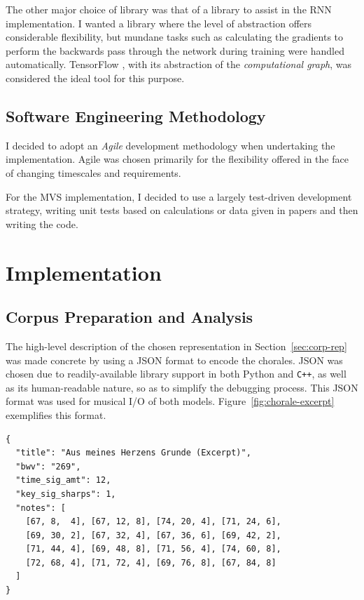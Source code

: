 \documentclass[12pt,a4paper,twoside,openright]{report}
\begin{document}
The other major choice of library was that of a library to assist in the RNN
implementation. I wanted a library where the level of abstraction offers
considerable flexibility, but mundane tasks such as calculating the gradients to
perform the backwards pass through the network during training were handled
automatically. TensorFlow \cite{abadi2016tensorflow}, with its abstraction of
the \emph{computational graph}, was considered the ideal tool for this purpose.

\section{Software Engineering Methodology}

I decided to adopt an \emph{Agile} development methodology when undertaking the
implementation. Agile was chosen primarily for the flexibility offered in the
face of changing timescales and requirements.

For the MVS implementation, I decided to use a largely test-driven development
strategy, writing unit tests based on calculations or data given in papers and
then writing the code. 

\chapter{Implementation}\label{chap:impl}

\section{Corpus Preparation and Analysis}\label{sec:corpus-prep-analysis}

The high-level description of the chosen representation in
Section~\ref{sec:corp-rep} was made concrete by using a JSON format to encode
the chorales. JSON was chosen due to readily-available library support in both
Python and \texttt{C++}, as well as its human-readable nature, so as to simplify
the debugging process. This JSON format was used for musical I/O of both models.
Figure~\ref{fig:chorale-excerpt} exemplifies this format. 

\vspace{4mm}
\begin{verbatim}
{
  "title": "Aus meines Herzens Grunde (Excerpt)",
  "bwv": "269",
  "time_sig_amt": 12,
  "key_sig_sharps": 1,
  "notes": [
    [67, 8,  4], [67, 12, 8], [74, 20, 4], [71, 24, 6], 
    [69, 30, 2], [67, 32, 4], [67, 36, 6], [69, 42, 2], 
    [71, 44, 4], [69, 48, 8], [71, 56, 4], [74, 60, 8], 
    [72, 68, 4], [71, 72, 4], [69, 76, 8], [67, 84, 8]
  ]
}
\end{verbatim}
\end{document}
